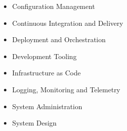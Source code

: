 \begin{itemize}
\item Configuration Management
\item Continuous Integration and Delivery
\item Deployment and Orchestration
\item Development Tooling
\item Infrastructure as Code
\item Logging, Monitoring and Telemetry
\item System Administration
\item System Design
\end{itemize}
